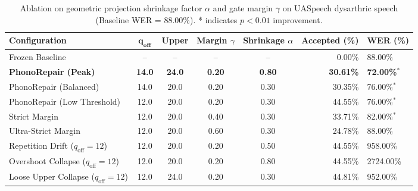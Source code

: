 \begin{table}[t]
\centering
\small
\caption{Ablation on geometric projection shrinkage factor $\alpha$ and gate margin $\gamma$ on UASpeech dysarthric speech (Baseline WER = 88.00\%). * indicates $p < 0.01$ improvement.}
\label{tab:ablation}
\begin{tabular}{lccccr}
\toprule
\textbf{Configuration} & $\mathbf{q_{\text{off}}}$ & \textbf{Upper} & \textbf{Margin $\gamma$} & \textbf{Shrinkage $\alpha$} & \textbf{Accepted (\%)} & \textbf{WER (\%)} \\
\midrule
Frozen Baseline & -- & -- & -- & -- & 0.00\% & 88.00\% \\
\midrule
\textbf{PhonoRepair (Peak)} & \textbf{14.0} & \textbf{24.0} & \textbf{0.20} & \textbf{0.80} & \textbf{30.61\%} & \textbf{72.00\%}$^*$ \\
PhonoRepair (Balanced) & 14.0 & 20.0 & 0.20 & 0.30 & 30.35\% & 76.00\%$^*$ \\
PhonoRepair (Low Threshold) & 12.0 & 20.0 & 0.20 & 0.30 & 44.55\% & 76.00\%$^*$ \\
\midrule
Strict Margin & 12.0 & 20.0 & 0.40 & 0.30 & 33.71\% & 82.00\%$^*$ \\
Ultra-Strict Margin & 12.0 & 20.0 & 0.60 & 0.30 & 24.78\% & 88.00\% \\
\midrule
Repetition Drift ($q_{\text{off}}=12$) & 12.0 & 20.0 & 0.20 & 0.50 & 44.55\% & 958.00\% \\
Overshoot Collapse ($q_{\text{off}}=12$) & 12.0 & 20.0 & 0.20 & 0.80 & 44.55\% & 2724.00\% \\
Loose Upper Collapse ($q_{\text{off}}=12$) & 12.0 & 24.0 & 0.20 & 0.30 & 44.81\% & 952.00\% \\
\bottomrule
\end{tabular}
\end{table}
